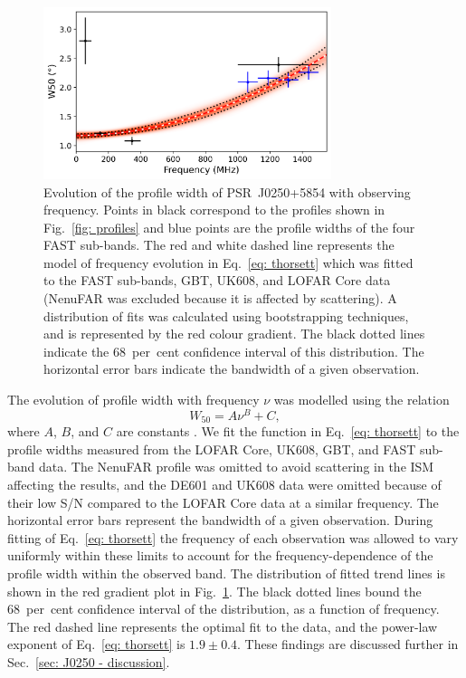 \begin{figure}
    \includegraphics[width=0.75\textwidth]{Figures/J0250/thorsett_relation.png}
    \caption[Profile evolution of PSR~J0250+5854 with observing frequency]{Evolution of the profile width of PSR~J0250+5854 with observing frequency. Points in black correspond to the profiles shown in Fig.~\ref{fig: profiles} and blue points are the profile widths of the four FAST sub-bands. The red and white dashed line represents the model of frequency evolution in Eq.~\eqref{eq: thorsett} which was fitted to the FAST sub-bands, GBT, UK608, and LOFAR Core data (NenuFAR was excluded because it is affected by scattering). A distribution of fits was calculated using bootstrapping techniques, and is represented by the red colour gradient. The black dotted lines indicate the 68~per~cent confidence interval of this distribution. The horizontal error bars indicate the bandwidth of a given observation.}
    \label{fig: width evolution}
\end{figure}
   
The evolution of profile width with frequency $\nu$ was modelled using the relation
\begin{equation}
    \label{eq: thorsett}
    W_{50} = A\nu^B + C,
\end{equation}
where $A$, $B$, and $C$ are constants \citep{Txxx1991, CWxx2014}. We fit the function in Eq.~\eqref{eq: thorsett} to the profile widths measured from the LOFAR Core, UK608, GBT, and FAST sub-band data. The NenuFAR profile was omitted to avoid scattering in the ISM affecting the results, and the DE601 and UK608 data were omitted because of their low S/N compared to the LOFAR Core data at a similar frequency. The horizontal error bars represent the bandwidth of a given observation. During fitting of Eq.~\eqref{eq: thorsett} the frequency of each observation was allowed to vary uniformly within these limits to account for the frequency-dependence of the profile width within the observed band. The distribution of fitted trend lines is shown in the red gradient plot in Fig.~\ref{fig: width evolution}. The black dotted lines bound the 68~per~cent confidence interval of the distribution, as a function of frequency. The red dashed line represents the optimal fit to the data, and the power-law exponent of Eq.~\eqref{eq: thorsett} is $1.9 \pm 0.4$. These findings are discussed further in Sec.~\ref{sec: J0250 - discussion}.



